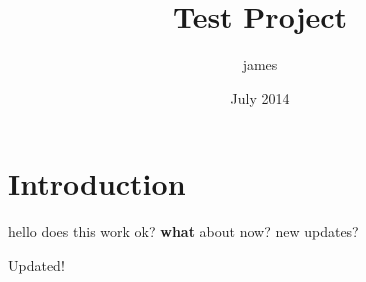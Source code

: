 \documentclass{article}
\title{Test Project}
\author{james }
\date{July 2014}
\begin{document}
\maketitle

\section{Introduction}

hello does this work ok? \textbf{what} about now? new updates?

Updated!
\end{document}
